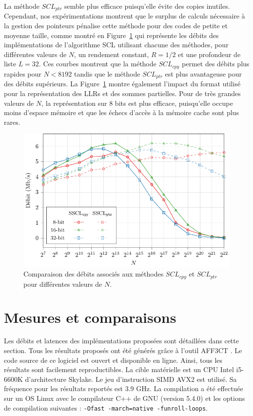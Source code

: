 La méthode $SCL_{ptr}$ semble plus efficace puisqu'elle évite des copies inutiles. Cependant, nos expérimentations montrent que le surplus de calculs nécessaire à la gestion des pointeurs pénalise cette méthode pour des codes de petite et moyenne taille, comme montré en Figure~\ref{fig:scl_mem} qui représente les débits des implémentations de l'algorithme SCL utilisant chacune des méthodes, pour différentes valeurs de $N$, un rendement constant, $R=1/2$ et une profondeur de liste $L=32$. Ces courbes montrent que la méthode $SCL_{cpy}$ permet des débits plus rapides pour $N<8192$ tandis que le méthode $SCL_{ptr}$ est plus avantageuse pour des débits supérieurs. La Figure~\ref{fig:scl_mem} montre également l'impact du format utilisé pour la représentation des LLRs et des sommes partielles. Pour de très grandes valeurs de $N$, la représentation sur 8 bits est plus efficace, puisqu'elle occupe moins d'espace mémoire et que les échecs d'accès à la mémoire cache sont plus rares. 

\begin{figure}
\centering
\includegraphics{main/ch2_fig/curves/thr/tikz/thr}
\caption{Comparaison des débits associés aux méthodes $SCL_{cpy}$ et $SCL_{ptr}$ pour différentes valeurs de $N$.}
\label{fig:scl_mem}
\end{figure}




\section{Mesures et comparaisons}
\label{sec:exp_scl}

Les débits et latences des implémentations proposées sont détaillées dans cette section. Tous les résultats proposés ont été générés grâce à l'outil AFF3CT \cite{aff3ct_aff3ct:_2016}. Le code source de ce logiciel est ouvert et disponible en ligne. Ainsi, tous les résultats sont facilement reproductibles. La cible matérielle est un CPU Intel i5-6600K d'architecture Skylake. Le jeu d'instruction SIMD AVX2 est utilisé. Sa fréquence pour les résultats reportés est 3.9 GHz. La compilation a été effectuée sur un OS Linux avec le compilateur C++ de GNU (version 5.4.0) et les options de compilation suivantes : \texttt{-Ofast -march=native -funroll-loops}.

